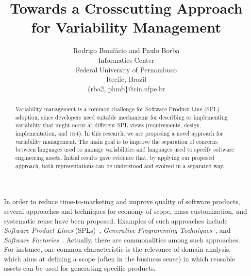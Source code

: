 \documentclass[times, 11pt,twocolumn]{article}
\begin{document}
\lstset{language=Haskell, numbers=left,
numberstyle=\tiny,numbersep=5pt,basicstyle=\scriptsize,aboveskip=10pt}

\title{Towards a Crosscutting Approach for Variability Management}


\author{Rodrigo Bonif\'{a}cio and Paulo Borba\\
Informatics Center \\ Federal University of Pernambuco \\ Recife, Brazil \\
\{rba2, phmb\}@cin.ufpe.br\\ }


\maketitle
\thispagestyle{empty}

\begin{abstract}
Variability management is a common challenge for Software Product
Line (SPL) adoption, since developers need suitable
mechanisms for describing or implementing variability
that might occur at different SPL views (requirements, design,
implementation, and test). In this research, we are proposing a
novel approach for variability management. The main goal is
to improve the separation of concerns between languages used to manage
variabilities and languages used to specify software engineering assets. 
Initial results gave evidence that, by applying our proposed 
approach, both representations can be understood and evolved in
a separated way.
\end{abstract}



\label{sec:intro}

In order to reduce time-to-marketing and improve quality of software products,
several approaches and techniques for economy of scope, mass customization, and
systematic reuse have been proposed. Examples of such approaches include \emph{Software Product
Lines} (SPLs)~\cite{Pohl:2005aa, Clements:2001aa}, \emph{Generative Programming
Techniques}~\cite{Czarnecki:2000aa}, and \emph{Software
Factories}~\cite{Greenfield:2003aa}. Actually, there are commonalities among
such approaches. For instance, one common characteristic is the relevance of
domain analysis, which aims at defining a scope (often in the business sense)
in which reusable assets can be used for generating specific products.
\end{document}
